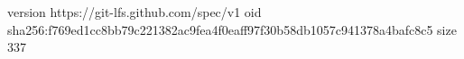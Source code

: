 version https://git-lfs.github.com/spec/v1
oid sha256:f769ed1cc8bb79c221382ac9fea4f0eaff97f30b58db1057c941378a4bafc8c5
size 337
